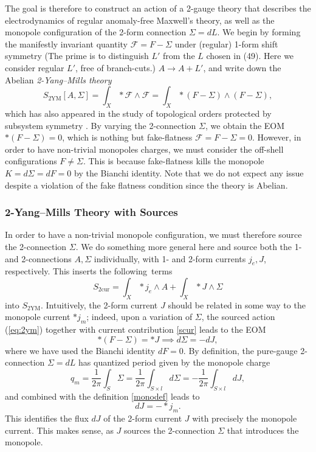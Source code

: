 \documentclass[onecolumn]{article}
\theoremstyle{theorem}
\theoremstyle{remark}
\theoremstyle{example}
\theoremstyle{definition}
\numberwithin{equation}{section}
\begin{document}
The goal   is therefore  to construct an action of a 2-gauge theory that describes the electrodynamics of {regular} anomaly-free Maxwell's theory, { {as well as}} the monopole configuration of the 2-form connection $\Sigma=dL$. We begin by forming the manifestly invariant quantity $\mathcal{F}=F -\Sigma$ under (regular) 1-form shift symmetry {(The prime is to distinguish $L'$ from the $L$ chosen in  (49). Here we consider regular $L'$, free of branch-cuts.)} $A\rightarrow A+L'$, and write down the Abelian {\it {2-Yang--Mills theory}} \cite{Baez:2002highergauge}
\begin{equation}
    S_\text{2YM}[A,\Sigma] = \int_X\ast\mathcal{F}\wedge\mathcal{F}=\int_X \ast (F-\Sigma)\wedge (F-\Sigma),\label{eq:2ym}
\end{equation}
which has also appeared in the study of topological orders protected by subsystem symmetry \cite{Dubinkin:2020kxo}. By varying the 2-connection $\Sigma$, we obtain the EOM $\ast (F-\Sigma)=0$, which is nothing but fake-flatness $\mathcal{F}=F-\Sigma=0$. However, in order to have non-trivial monopoles charges, we { {must}} consider the off-shell configurations $F\neq \Sigma$. This is because fake-flatness kills the monopole $K=d\Sigma = dF=0$ by the Bianchi identity. Note that we do not expect any issue despite a violation of the fake flatness condition since the theory is Abelian.  


\subsubsection{2-Yang--Mills Theory with Sources}
In order to have a non-trivial monopole configuration, we must therefore source the 2-connection $\Sigma$. We do something more general here and source both the 1- and 2-connections $A,\Sigma$ individually, with 1- and 2-form currents $j_e,J$, respectively. This inserts the following~terms
\begin{equation}\label{scur}
    S_\text{2cur}=\int_X \ast j_e\wedge A + \int_X \ast J \wedge\Sigma 
\end{equation}
into $S_\text{2YM}$. Intuitively, the 2-form current $J$ should be related in some way to the monopole current $\ast j_m$; indeed, upon a variation of $\Sigma$, the sourced action  (\ref{eq:2ym}) together with current contribution \eqref{scur} leads to the EOM
\begin{equation}
    \ast (F-\Sigma) = \ast J\implies d\Sigma=-dJ,\nonumber
\end{equation}
where we have used the Bianchi identity $dF=0$. By definition, the pure-gauge 2-connection $\Sigma=dL$ has quantized period given by the monopole charge
\begin{equation}
    q_m =\frac{1}{2\pi} \int_S \Sigma = \frac{1}{2\pi}\int_{S\times l}d\Sigma = -\frac{1}{2\pi}\int_{S\times l} dJ,\nonumber
\end{equation}
and combined with the definition  \eqref{monodef} leads to
\begin{equation}
    dJ = -\ast j_m.\nonumber
\end{equation}
{This} identifies the flux $dJ$ of the 2-form current $J$ with precisely the monopole current. This makes sense, as $J$ sources the 2-connection $\Sigma$ that introduces the monopole.
\end{document}
